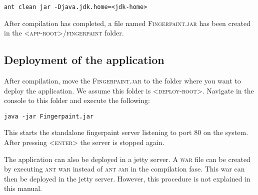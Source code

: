 \begin{verbatim}
ant clean jar -Djava.jdk.home=<jdk-home>
\end{verbatim}

After compilation has completed, a file named \textsc{Fingerpaint.jar} has been created in the \textsc{<app-root>/fingerpaint} folder.

\subsection{Deployment of the application}
After compilation, move the \textsc{Fingerpaint.jar} to the folder where you want to deploy the application. We assume this folder is \textsc{<deploy-root>}. Navigate in the console to this folder and execute the following:

\begin{verbatim}
java -jar Fingerpaint.jar
\end{verbatim}

This starts the standalone fingerpaint server listening to port 80 on the system. After pressing \textsc{<enter>} the server is stopped again.

The application can also be deployed in a jetty server. A \textsc{war} file can be created by executing \textsc{ant war} instead of \textsc{ant jar} in the compilation fase. This war can then be deployed in the jetty server. However, this procedure is not explained in this manual.
